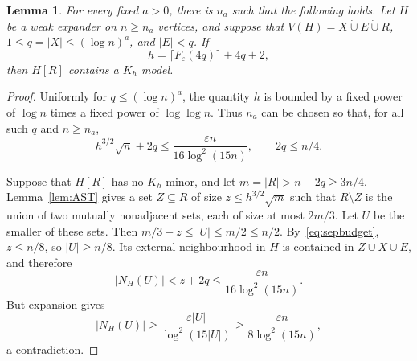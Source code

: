 \documentclass[10pt,letterpaper]{article}
\newtheorem{lemma}[theorem]{Lemma}
\theoremstyle{definition}
\theoremstyle{remark}
\newcommand{\eps}{\varepsilon}
\newcommand{\dcup}{\mathbin{\dot\cup}}
\begin{document}
\begin{lemma}\label{lem:largeclique}
For every fixed $a>0$, there is $n_a$ such that the following holds. Let $H$ be a weak expander on $n\ge n_a$ vertices, and suppose that $V(H)=X\dcup E\dcup R$, $1\le q=|X|\le(\log n)^a$, and $|E|<q$. If
\begin{equation}\label{eq:h}
h=\lceil F_\eps(4q)\rceil+4q+2,
\end{equation}
then $H[R]$ contains a $K_h$ model.
\end{lemma}
\begin{proof}
Uniformly for $q\le(\log n)^a$, the quantity $h$ is bounded by a fixed power of $\log n$ times a fixed power of $\log\log n$. Thus $n_a$ can be chosen so that, for all such $q$ and $n\ge n_a$,
\begin{equation}\label{eq:sepbudget}
h^{3/2}\sqrt n+2q\le\frac{\eps n}{16\log^2(15n)},
\qquad 2q\le n/4.
\end{equation}

Suppose that $H[R]$ has no $K_h$ minor, and let $m=|R|>n-2q\ge3n/4$. Lemma~\ref{lem:AST} gives a set $Z\subseteq R$ of size $z\le h^{3/2}\sqrt m$ such that $R\setminus Z$ is the union of two mutually nonadjacent sets, each of size at most $2m/3$. Let $U$ be the smaller of these sets. Then $m/3-z\le |U|\le m/2\le n/2$. By~\eqref{eq:sepbudget}, $z\le n/8$, so $|U|\ge n/8$. Its external neighbourhood in $H$ is contained in $Z\cup X\cup E$, and therefore
\[
|N_H(U)|<z+2q\le\frac{\eps n}{16\log^2(15n)}.
\]
But expansion gives
\[
|N_H(U)|\ge\frac{\eps|U|}{\log^2(15|U|)}
\ge\frac{\eps n}{8\log^2(15n)},
\]
a contradiction.
\end{proof}
\end{document}

